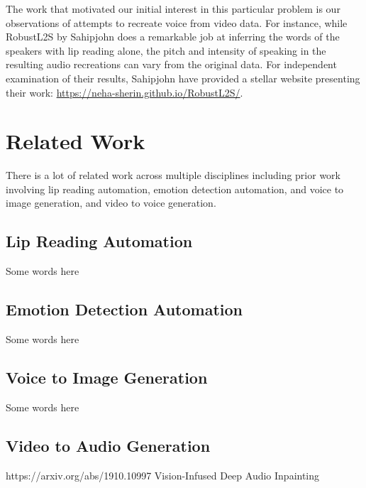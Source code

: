 \documentclass[10pt,twocolumn,letterpaper]{article}
\begin{document}
The work that motivated our initial interest in this particular problem is our observations of attempts to  recreate voice from video data. For instance, while RobustL2S by Sahipjohn \etal \cite{RobustL2S} does a remarkable job at inferring the words of the speakers with lip reading alone, the pitch and intensity of speaking in the resulting audio recreations can vary from the original data. For independent examination of their results, Sahipjohn \etal have provided a stellar website presenting their work: \href{https://neha-sherin.github.io/RobustL2S/}{https://neha-sherin.github.io/RobustL2S/}.



\section{Related Work}
\label{sec:related}

There is a lot of related work across multiple disciplines including prior work involving lip reading automation, emotion detection automation, and voice to image generation, and video to voice generation. 


\subsection{Lip Reading Automation}

Some words here

\subsection{Emotion Detection Automation}

Some words here

\subsection{Voice to Image Generation}

Some words here

\subsection{Video to Audio Generation}

https://arxiv.org/abs/1910.10997 
Vision-Infused Deep Audio Inpainting
\end{document}
